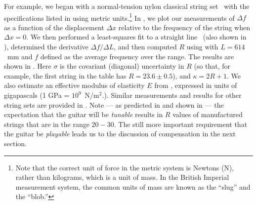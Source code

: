 For example, we began with a normal-tension nylon classical string set~\cite{ref:daddariostcweb} with the specifications listed in  using metric units.\footnote{Note that the correct unit of force in the metric system is Newtons (N), rather than kilograms, which is a unit of mass. In the British Imperial measurement system, the common units of mass are known as the ``slug'' and the ``blob.''} In , we plot our measurements of $\Delta f$ as a function of the displacement $\Delta x$ relative to the frequency of the string when $\Delta x = 0$. We then performed a least-squares fit to a straight line~\cite{ref:bevington2003dre} (also shown in ), determined the derivative $\Delta f / \Delta L$, and then computed $R$ using  with $L = 614$~mm and $f$ defined as the average frequency over the range. The results are shown in . Here $\sigma$ is the covariant (diagonal) uncertainty in $R$ (so that, for example, the first string in the table has $R = 23.6 \pm 0.5$), and $\kappa = 2 R + 1$. We also estimate an effective modulus of elasticity $E$ from , expressed in units of gigapascals (1 GPa = $10^9$~N/m$^2$.). Similar measurements and results for other string sets are provided in . Note --- as predicted in  and shown in  --- the expectation that the guitar will be \emph{tunable} results in $R$ values of manufactured strings that are in the range $20 - 30$. The still more important requirement that the guitar be \emph{playable} leads us to the discussion of compensation in the next section.

